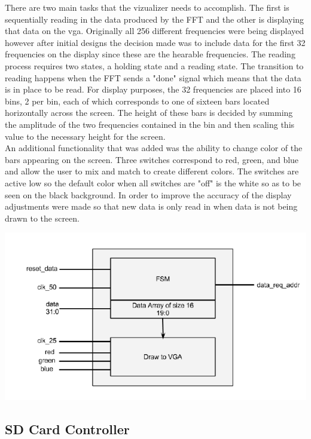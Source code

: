 \documentclass{article}
\begin{document}
There are two main tasks that the vizualizer needs to accomplish.  
The first is sequentially reading in the data produced by the FFT and the 
other is displaying that data on the vga.  Originally all 256 different 
frequencies were being displayed however after initial designs the decision 
made was to include data for the first 32 frequencies on the display since 
these are the hearable frequencies.  The reading process requires two states, 
a holding state and a reading state.  The transition to reading happens when 
the FFT sends a "done" signal which means that the data is in place to be read.  
For display purposes, the 32 frequencies are placed into 16 bins, 2 per bin, 
each of which corresponds to one of sixteen bars located horizontally across 
the screen.  The height of these bars is decided by summing the amplitude of 
the two frequencies contained in the bin and then scaling this value to the 
necessary height for the screen.\\An additional functionality that was added 
was the ability to change color of the bars appearing on the screen.  
Three switches correspond to red, green, and blue and allow the user to mix 
and match to create different colors.  The switches are active low so the 
default color when all switches are "off" is the white so as to be seen on the 
black background.  In order to improve the accuracy of the display adjustments 
were made so that new data is only read in when data is not being drawn to the screen.

\includegraphics[width=20 cm]{viz_block_diagram.png}

\subsection{SD Card Controller}
\end{document}

